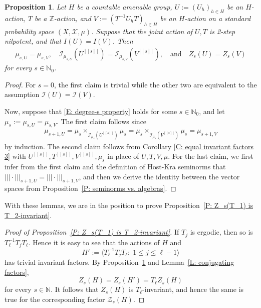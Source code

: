 \documentclass[11pt]{amsart}
\newtheorem{proposition}[lemma]{Proposition}
\theoremstyle{definition}
\newcommand{\N}{{\mathbb N}}
\newcommand{\Z}{{\mathbb Z}}
\newcommand{\CI}{{\mathcal I}}
\newcommand{\CX}{{\mathcal X}}
\newcommand{\CZ}{{\mathcal Z}}
\newcommand{\nnorm}[1]{\lvert\!|\!| #1|\!|\!\rvert}
\newcommand{\cube}[1]{{[\![#1]\!]}}
\newcommand{\inv}{^{-1}}
\newcommand{\1}{{\mathbf{1}}}
\begin{document}
\begin{proposition}\label{P: invariance of Host-Kra factors}
    Let $H$ be a countable amenable group, $U:=(U_h)_{h\in H}$ be an $H$-action, $T$ be a $\Z$-action, and $V := (T\inv U_h T)_{h\in H}$ be an $H$-action on a standard probability space $(X, \CX, \mu)$. Suppose that the joint action of $U,T$ is 2-step nilpotent, and that {$I(U)=I(V)$}. Then
    \begin{align}\label{E: degree-s property}
      \mu_{s,U} = \mu_{s,V},\quad \CI_{\mu_{s,U}}(U^\cube{s}) = \CI_{\mu_{s,V}}(V^\cube{s}),\quad \textrm{and}\quad {Z_{s}(U) = Z_{s}(V)}
    \end{align}
    for every $s\in\N_0$.
\end{proposition}
\begin{proof}
    For $s=0$, the first claim is trivial while the other two are equivalent to the assumption $\CI(U)=\CI(V)$.
    
    Now, suppose that \eqref{E: degree-s property} holds for some $s\in\N_0$, and let $\mu_s  := \mu_{s,U} = \mu_{s,V}$. 
    The first claim follows since
    \begin{align*}
        \mu_{s+1,U} = \mu_s\times_{\CI_{\mu_{s}}(U^\cube{s})}\mu_s = \mu_s\times_{\CI_{\mu_{s}}(V^\cube{s})}\mu_s = \mu_{s+1,V}
    \end{align*}
    by induction.
    The second claim follows from Corollary \ref{C: equal invariant factors 3} with $U^\cube{s}, T^\cube{s}, V^\cube{s}, \mu_s$ in place of $U, T, V, \mu$. {For the last claim, we first infer from the first claim and the definition of Host-Kra seminorms that $\nnorm{\cdot}_{s+1, U}=\nnorm{\cdot}_{s+1, V}$, and then we derive the identity between the vector spaces from Proposition~\ref{P: seminorms vs. algebras}.}
\end{proof}


With these lemmas, we are in the position to prove Proposition~\ref{P: Z_s(T_1) is T_2-invariant}.

\begin{proof}[Proof of Proposition~\ref{P: Z_s(T_1) is T_2-invariant}]
    If $T_j$ is ergodic, then so is $T_\ell\inv T_j T_\ell$. Hence it is easy to see that the actions of $H$ and $$H' := \langle T_\ell\inv T_j T_\ell\colon\; 1\leq j\leq \ell-1\rangle$$ 
    has trivial invariant factors. 
    {By Proposition~\ref{P: invariance of Host-Kra factors} and Lemma~\ref{L: conjugating factors}, $$Z_s(H) = Z_s(H')=T_\ell Z_s(H)$$ for every $s\in\N$. It follows that $Z_s(H)$ is $T_\ell$-invariant, and hence the same is true for the corresponding factor $\CZ_s(H)$.}
\end{proof}
\end{document}
